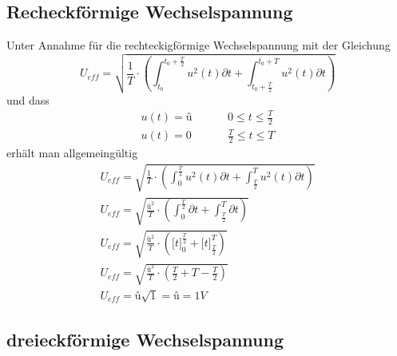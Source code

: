         \subsection{Recheckförmige Wechselspannung}
            Unter Annahme für die rechteckigförmige Wechselspannung mit der Gleichung
            \begin{equation}\label{equ:rechteck}
                U_{eff}=\sqrt{\frac{1}{T}\cdot\left(\int_{t_0}^{t_0+\frac{T}{2}} u^2(t)\partial t + \int_{t_0+\frac{T}{2}}^{t_0+T} u^2(t)\partial t\right)}
            \end{equation} 
            und dass 
            \begin{align}
                u(t)=û  &\hspace{1cm}0 \leq t \leq \frac{T}{2}\\
                u(t)=0 &\hspace{1cm} \frac{T}{2} \leq t \leq T
            \end{align}    
            erhält man allgemeingültig 
            \begin{gather}
                U_{eff}=\sqrt{\frac{1}{T}\cdot\left(\int_{0}^{\frac{T}{2}} u^2(t)\partial t + \int_{\frac{T}{2}}^{T} u^2(t)\partial t\right)}    \\
                U_{eff}=\sqrt{\frac{û^2}{T}\cdot\left(\int_{0}^{\frac{T}{2}} \partial t + \int_{\frac{T}{2}}^{T}\partial t\right)}    \\
                U_{eff}=\sqrt{\frac{û^2}{T}\cdot\left(\big[t\big]_{0}^{\frac{T}{2}} + \big[t\big]_{\frac{T}{2}}^{T}\right)} \\  
                U_{eff}=\sqrt{\frac{û^2}{T}\cdot\left(\frac{T}{2}+T-\frac{T}{2}\right)} \\
                U_{eff}=û\sqrt{1} = û = 1V
            \end{gather}
        \subsection{dreieckförmige Wechselspannung}   
       
